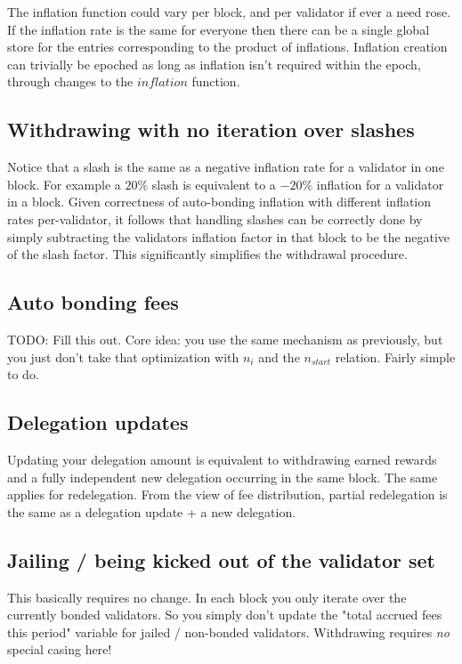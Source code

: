 \documentclass[]{article}
\begin{document}
The inflation function could vary per block,
and per validator if ever a need rose. 
If the inflation rate is the same for everyone then there can be a single global store for the entries corresponding to the product of inflations.
Inflation creation can trivially be epoched as long as inflation isn't required within the epoch, through changes to the $inflation$ function.

\subsection{Withdrawing with no iteration over slashes}
Notice that a slash is the same as a negative inflation rate for a validator in one block.
For example a $20\%$ slash is equivalent to a $-20\%$ inflation for a validator in a block.
Given correctness of auto-bonding inflation with different inflation rates per-validator,
it follows that handling slashes can be correctly done by simply subtracting the validators inflation factor in that block to be the negative of the slash factor.
This significantly simplifies the withdrawal procedure.

\subsection{Auto bonding fees}
TODO: Fill this out. 
Core idea: you use the same mechanism as previously, but you just don't take that optimization with $n_{i}$ and the $n_{start}$ relation.
Fairly simple to do.

\subsection{Delegation updates}
Updating your delegation amount is equivalent to withdrawing earned rewards and a fully independent new delegation occurring in the same block.
The same applies for redelegation.
From the view of fee distribution, partial redelegation is the same as a delegation update + a new delegation.

\subsection{Jailing / being kicked out of the validator set}
This basically requires no change.
In each block you only iterate over the currently bonded validators.
So you simply don't update the "total accrued fees this period" variable for jailed / non-bonded validators.
Withdrawing requires \textit{no} special casing here!
\end{document}
